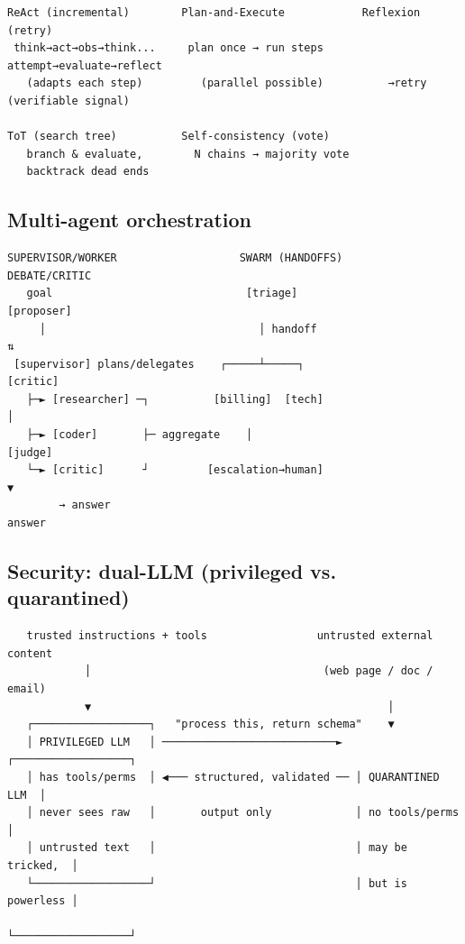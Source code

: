 \documentclass[11pt]{article}
\begin{document}
\setcodelang{}

\begin{verbatim}
ReAct (incremental)        Plan-and-Execute            Reflexion (retry)
 think→act→obs→think...     plan once → run steps        attempt→evaluate→reflect
   (adapts each step)         (parallel possible)          →retry (verifiable signal)

ToT (search tree)          Self-consistency (vote)
   branch & evaluate,        N chains → majority vote
   backtrack dead ends
\end{verbatim}

\subsection{Multi-agent orchestration}\label{multi-agent-orchestration}

\setcodelang{}

\begin{verbatim}
SUPERVISOR/WORKER                   SWARM (HANDOFFS)               DEBATE/CRITIC
   goal                              [triage]                      [proposer]
     │                                 │ handoff                       ⇅
 [supervisor] plans/delegates    ┌─────┴─────┐                    [critic]
   ├─► [researcher] ─┐          [billing]  [tech]                     │
   ├─► [coder]       ├─ aggregate    │                              [judge]
   └─► [critic]      ┘         [escalation→human]                     ▼
        → answer                                                   answer
\end{verbatim}

\subsection{Security: dual-LLM (privileged vs. quarantined)}\label{security-dual-llm-privileged-vs-quarantined}

\setcodelang{}

\begin{verbatim}
   trusted instructions + tools                 untrusted external content
            │                                    (web page / doc / email)
            ▼                                              │
   ┌──────────────────┐   "process this, return schema"    ▼
   │ PRIVILEGED LLM   │ ───────────────────────────► ┌──────────────────┐
   │ has tools/perms  │ ◀─── structured, validated ── │ QUARANTINED LLM  │
   │ never sees raw   │       output only             │ no tools/perms   │
   │ untrusted text   │                               │ may be tricked,  │
   └──────────────────┘                               │ but is powerless │
                                                      └──────────────────┘
\end{verbatim}
\end{document}
